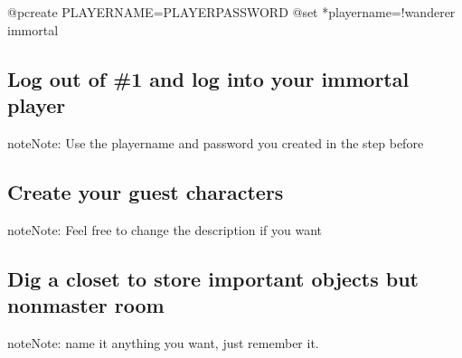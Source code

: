 \documentclass[letterpaper,10pt,english]{sphinxmanual}
\begin{document}
\begin{sphinxVerbatim}[commandchars=\\\{\}]
@pcreate PLAYERNAME=PLAYERPASSWORD
@set *playername=!wanderer immortal
\end{sphinxVerbatim}


\subsection{Log out of \#1 and log into your immortal player}
\label{\detokenize{gettingstarted:log-out-of-1-and-log-into-your-immortal-player}}
\begin{sphinxadmonition}{note}{Note:}
\sphinxAtStartPar
Use the playername and password you created in the step before
\end{sphinxadmonition}

\begin{sphinxVerbatim}[commandchars=\\\{\}]
  
\end{sphinxVerbatim}


\subsection{Create your guest characters}
\label{\detokenize{gettingstarted:create-your-guest-characters}}
\begin{sphinxadmonition}{note}{Note:}
\sphinxAtStartPar
Feel free to change the description if you want
\end{sphinxadmonition}

\begin{sphinxVerbatim}[commandchars=\\\{\}]
  
\end{sphinxVerbatim}


\subsection{Dig a closet to store important objects but non\sphinxhyphen{}master room}
\label{\detokenize{gettingstarted:dig-a-closet-to-store-important-objects-but-non-master-room}}
\begin{sphinxadmonition}{note}{Note:}
\sphinxAtStartPar
name it anything you want, just remember it.
\end{sphinxadmonition}
\end{document}
